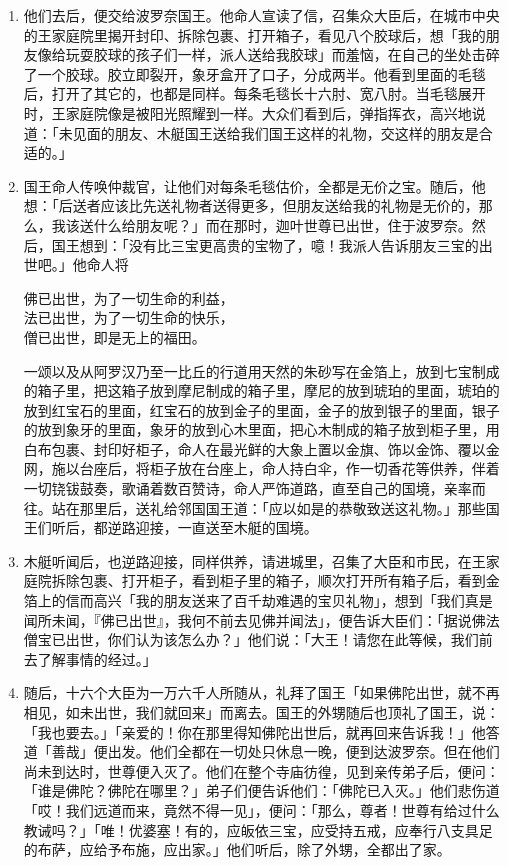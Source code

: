 \begin{enumerate}
\item 他们去后，便交给波罗奈国王。他命人宣读了信，召集众大臣后，在城市中央的王家庭院里揭开封印、拆除包裹、打开箱子，看见八个胶球后，想「我的朋友像给玩耍胶球的孩子们一样，派人送给我胶球」而羞恼，在自己的坐处击碎了一个胶球。胶立即裂开，象牙盒开了口子，分成两半。他看到里面的毛毯后，打开了其它的，也都是同样。每条毛毯长十六肘、宽八肘。当毛毯展开时，王家庭院像是被阳光照耀到一样。大众们看到后，弹指挥衣，高兴地说道：「未见面的朋友、木艇国王送给我们国王这样的礼物，交这样的朋友是合适的。」
\item 国王命人传唤仲裁官，让他们对每条毛毯估价，全都是无价之宝。随后，他想：「后送者应该比先送礼物者送得更多，但朋友送给我的礼物是无价的，那么，我该送什么给朋友呢？」而在那时，迦叶世尊已出世，住于波罗奈。然后，国王想到：「没有比三宝更高贵的宝物了，噫！我派人告诉朋友三宝的出世吧。」他命人将\begin{quoting}佛已出世，为了一切生命的利益，\\法已出世，为了一切生命的快乐，\\僧已出世，即是无上的福田。\end{quoting}一颂以及从阿罗汉乃至一比丘的行道用天然的朱砂写在金箔上，放到七宝制成的箱子里，把这箱子放到摩尼制成的箱子里，摩尼的放到琥珀的里面，琥珀的放到红宝石的里面，红宝石的放到金子的里面，金子的放到银子的里面，银子的放到象牙的里面，象牙的放到心木里面，把心木制成的箱子放到柜子里，用白布包裹、封印好柜子，命人在最光鲜的大象上置以金旗、饰以金饰、覆以金网，施以台座后，将柜子放在台座上，命人持白伞，作一切香花等供养，伴着一切铙钹鼓奏，歌诵着数百赞诗，命人严饰道路，直至自己的国境，亲率而往。站在那里后，送礼给邻国国王道：「应以如是的恭敬致送这礼物。」那些国王们听后，都逆路迎接，一直送至木艇的国境。
\item 木艇听闻后，也逆路迎接，同样供养，请进城里，召集了大臣和市民，在王家庭院拆除包裹、打开柜子，看到柜子里的箱子，顺次打开所有箱子后，看到金箔上的信而高兴「我的朋友送来了百千劫难遇的宝贝礼物」，想到「我们真是闻所未闻，『佛已出世』，我何不前去见佛并闻法」，便告诉大臣们：「据说佛法僧宝已出世，你们认为该怎么办？」他们说：「大王！请您在此等候，我们前去了解事情的经过。」
\item 随后，十六个大臣为一万六千人所随从，礼拜了国王「如果佛陀出世，就不再相见，如未出世，我们就回来」而离去。国王的外甥随后也顶礼了国王，说：「我也要去。」「亲爱的！你在那里得知佛陀出世后，就再回来告诉我！」他答道「善哉」便出发。他们全都在一切处只休息一晚，便到达波罗奈。但在他们尚未到达时，世尊便入灭了。他们在整个寺庙彷徨，见到亲传弟子后，便问：「谁是佛陀？佛陀在哪里？」弟子们便告诉他们：「佛陀已入灭。」他们悲伤道「哎！我们远道而来，竟然不得一见」，便问：「那么，尊者！世尊有给过什么教诫吗？」「唯！优婆塞！有的，应皈依三宝，应受持五戒，应奉行八支具足的布萨，应给予布施，应出家。」他们听后，除了外甥，全都出了家。

\end{enumerate}
